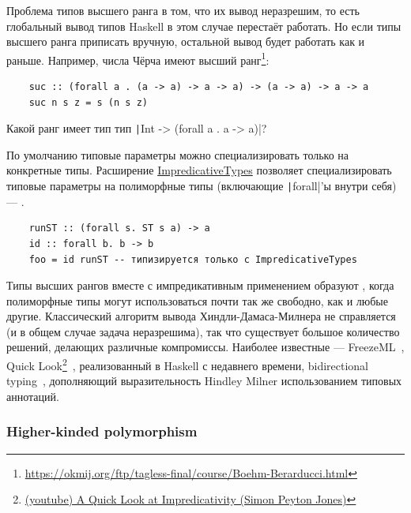 Проблема типов высшего ранга в том, что их вывод неразрешим, то есть глобальный вывод типов Haskell в этом случае перестаёт работать.
Но если типы высшего ранга приписать вручную, остальной вывод будет работать как и раньше.
Например, числа Чёрча имеют высший ранг\footnote{\url{https://okmij.org/ftp/tagless-final/course/Boehm-Berarducci.html}}:
\begin{verbatim}
    suc :: (forall a . (a -> a) -> a -> a) -> (a -> a) -> a -> a
    suc n s z = s (n s z)
\end{verbatim}

\begin{task}
    Какой ранг имеет тип тип \texttt|Int -> (forall a . a -> a)|?
\end{task}

По умолчанию типовые параметры можно специализировать только на конкретные типы.
Расширение \href{https://downloads.haskell.org/ghc/latest/docs/users_guide/exts/impredicative_types.html}{ImpredicativeTypes} позволяет специализировать типовые параметры на полиморфные типы (включающие \texttt|forall|'ы внутри себя) --- .
\begin{verbatim}
    runST :: (forall s. ST s a) -> a
    id :: forall b. b -> b
    foo = id runST -- типизируется только с ImpredicativeTypes
\end{verbatim}

Типы высших рангов вместе с импредикативным применением образуют , когда полиморфные типы могут использоваться почти так же свободно, как и любые другие.
Классический алгоритм вывода Хиндли-Дамаса-Милнера не справляется (и в общем случае задача неразрешима), так что существует большое количество решений, делающих различные компромиссы.
Наиболее известные --- FreezeML~\cite{emrich2020freezeml}, Quick Look\footnote{\href{https://youtu.be/ZuNMo136QqI?si=qp8PAEeeF-bioCB_}{(youtube) A Quick Look at Impredicativity (Simon Peyton Jones)}}~\cite{serrano2020quick}, реализованный в Haskell с недавнего времени, bidirectional typing~\cite{christiansen2013bidirectional, dunfield2019sound}, дополняющий выразительность Hindley Milner использованием типовых аннотаций.

\subsubsection{Higher-kinded polymorphism}

